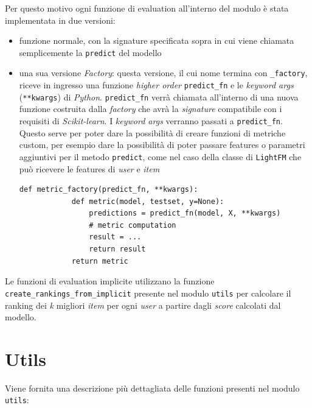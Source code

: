 Per questo motivo ogni funzione di evaluation all'interno del modulo è stata implementata in due versioni:

\begin{itemize}
    \item funzione normale, con la signature specificata sopra in cui viene chiamata semplicemente la \texttt{predict} del modello
    \item una sua versione \textit{Factory}: questa versione, il cui nome termina con \texttt{\_factory}, riceve in ingresso una funzione \textit{higher order} \texttt{predict\_fn} e le \textit{keyword args} (\texttt{**kwargs}) di \textit{Python}. \texttt{predict\_fn} verrà chiamata all'interno di una nuova funzione costruita dalla \textit{factory} che avrà la \textit{signature} compatibile con i requisiti di \textit{Scikit-learn}. I \textit{keyword args} verranno passati a \texttt{predict\_fn}. Questo serve per poter dare la possibilità di creare funzioni di metriche custom, per esempio dare la possibilità di poter passare features o parametri aggiuntivi per il metodo \texttt{predict}, come nel caso della classe di \texttt{LightFM} che può ricevere le features di \textit{user} e \textit{item}
    \begin{lstlisting}[caption=Implementazione in pseudo codice di una \textit{factory} per una metrica generica ]
        def metric_factory(predict_fn, **kwargs):
            def metric(model, testset, y=None):
                predictions = predict_fn(model, X, **kwargs)
                # metric computation
                result = ...
                return result
            return metric
    \end{lstlisting}
\end{itemize}

Le funzioni di evaluation implicite utilizzano la funzione \\ \texttt{create\_rankings\_from\_implicit} presente nel modulo \texttt{utils} per calcolare il ranking dei \textit{k} migliori \textit{item} per ogni \textit{user} a partire dagli \textit{score} calcolati dal modello.


\section{Utils}

Viene fornita una descrizione più dettagliata delle funzioni presenti nel modulo \texttt{utils}:

